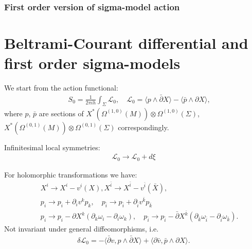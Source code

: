 \documentclass[9pt]{beamer}
\def\b{\bar}
\newcommand{\p}{\partial}
\def\b{\bar}
\begin{document}
\begin{frame}
\frametitle{First order version of sigma-model action}
\section[Beltrami-Courant differential]{Beltrami-Courant differential and  first order sigma-models}
We start from the action functional:
\begin{eqnarray*}
&&S_0=\frac{1}{2\pi ih}\int_\Sigma \mathcal{L}_0, \quad \mathcal{L}_0=\langle p\wedge\bar{\partial} X\rangle-
\langle \bar{p}\wedge{\partial} X\rangle,
\end{eqnarray*}
where $p$, $\b p$ are sections of 
$X^*(\Omega^{(1,0)}(M))\otimes \Omega^{(1,0)}(\Sigma)$, $X^*(\Omega^{(0,1)}(M))\otimes \Omega^{(0,1)}(\Sigma)$ correspondingly.\\\vspace*{3mm}

Infinitesimal local symmetries:
\begin{eqnarray*}
\mathcal{L}_0\to \mathcal{L}_0+d\xi
\end{eqnarray*}

For holomorphic transformations we have:
\begin{eqnarray*}
&& X^i\to X^i-v^i(X), X^{\b i}\to X^{\b i}-v^{\b i}(\b X),\\
&&p_i\to p_i+\p_i v^k p_k, \quad p_{\b i}\to p_{\b i}+\p_{\b i} v^{\b k} p_{\b k}\\
&&p_i\to p_i-\p X^k(\p_k\omega_i-\p_i\omega_k), \quad p_{\b i}\to p_{\b i}-\bar{\p} X^{\b k}(\p_{\b k}\omega_{\b i}-\p_{\b i}\omega_{\b k}).
\end{eqnarray*}
Not invariant under general diffeomorphisms, i.e. 
\begin{eqnarray*}
 \delta \mathcal{L}_0=-\langle \b \p v, p\wedge \b \p X\rangle +\langle \p \b v , \b p\wedge \p X\rangle.
\end{eqnarray*}




\end{frame}
\end{document}
